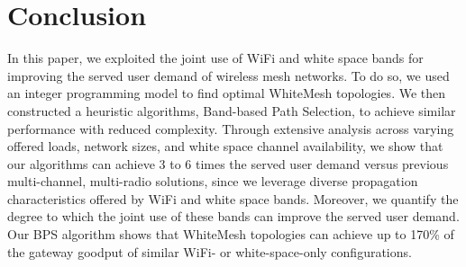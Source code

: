\section{Conclusion}
\label{sec:conclusion}
In this paper, we exploited the joint use of WiFi and white space bands for 
improving the served user demand of wireless mesh networks.  To do so, we
used an integer programming model to find optimal WhiteMesh topologies.  We
then constructed a heuristic algorithms, Band-based
Path Selection, to achieve similar performance with reduced complexity. Through 
extensive analysis across varying offered loads, network sizes, and white space 
channel availability, we show that our algorithms can achieve 3 to 6 times the served
user demand versus previous multi-channel, multi-radio solutions, since we leverage diverse 
propagation characteristics offered by WiFi and white space bands.  Moreover,
we quantify the degree to which the joint use of these bands can improve the served
user demand. Our BPS algorithm shows that WhiteMesh topologies can achieve up to 
170\% of the gateway goodput of similar WiFi- or white-space-only configurations.


